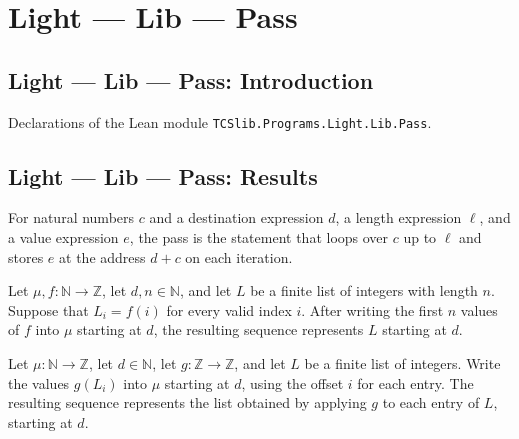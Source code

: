 \section{Light --- Lib --- Pass}
\subsection*{Light --- Lib --- Pass: Introduction}

Declarations of the Lean module \texttt{TCSlib.Programs.Light.Lib.Pass}.

\subsection*{Light --- Lib --- Pass: Results}

\begin{definition}
\label{Light.pass}
\leanok
{}
For natural numbers $c$ and a destination expression $d$, a length expression $\ell$,
and a value expression $e$, the pass is the statement that loops over $c$ up to $\ell$
and stores $e$ at the address $d+c$ on each iteration.
\end{definition}

\begin{theorem}
\label{Light.seg_wrote}
\leanok
{}
Let $\mu,f:\mathbb{N}\to\mathbb{Z}$, let $d,n\in\mathbb{N}$, and let $L$ be a finite
list of integers with length $n$. Suppose that $L_i=f(i)$ for every valid index $i$.
After writing the first $n$ values of $f$ into $\mu$ starting at $d$, the resulting
sequence represents $L$ starting at $d$.
\end{theorem}

\begin{theorem}
\label{Light.seg_wrote_map}
\leanok
{}
Let $\mu:\mathbb{N}\to\mathbb{Z}$, let $d\in\mathbb{N}$, let
$g:\mathbb{Z}\to\mathbb{Z}$, and let $L$ be a finite list of integers. Write the values
$g(L_i)$ into $\mu$ starting at $d$, using the offset $i$ for each entry. The resulting
sequence represents the list obtained by applying $g$ to each entry of $L$, starting at
$d$.
\end{theorem}


